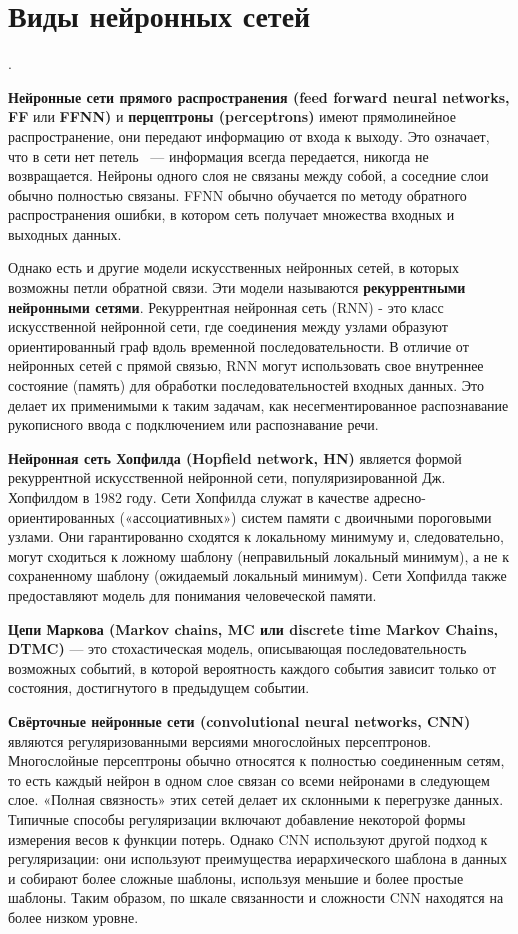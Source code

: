 \section{Виды нейронных сетей}.

 \textbf{Нейронные сети прямого распространения 
(feed forward neural networks, FF} или \textbf{FFNN)} и 
\textbf{перцептроны (perceptrons)} имеют прямолинейное распространение, они передают информацию от входа к выходу. Это означает, что в сети нет петель ~--- информация всегда передается, никогда не возвращается. Нейроны одного слоя не связаны между собой, а соседние слои обычно полностью связаны. FFNN обычно обучается по методу обратного распространения ошибки, в котором сеть получает множества входных и выходных данных.

Однако есть и другие модели искусственных нейронных сетей, в которых возможны петли обратной связи. Эти модели называются \textbf{рекуррентными нейронными сетями}. Рекуррентная нейронная сеть (RNN) - это класс искусственной нейронной сети, где соединения между узлами образуют ориентированный граф вдоль временной последовательности. В отличие от нейронных сетей с прямой связью, RNN могут использовать свое внутреннее состояние (память) для обработки последовательностей входных данных. Это делает их применимыми к таким задачам, как несегментированное распознавание рукописного ввода с подключением или распознавание речи.

\textbf{Нейронная сеть Хопфилда (Hopfield network, HN)} является формой рекуррентной искусственной нейронной сети, популяризированной Дж. Хопфилдом в 1982 году. Сети Хопфилда служат в качестве адресно-ориентированных («ассоциативных») систем памяти с двоичными пороговыми узлами. Они гарантированно сходятся к локальному минимуму и, следовательно, могут сходиться к ложному шаблону (неправильный локальный минимум), а не к сохраненному шаблону (ожидаемый локальный минимум). Сети Хопфилда также предоставляют модель для понимания человеческой памяти.

\textbf{Цепи Маркова (Markov chains, MC или discrete time Markov Chains, DTMC)} — это стохастическая модель, описывающая последовательность возможных событий, в которой вероятность каждого события зависит только от состояния, достигнутого в предыдущем событии.

\textbf{Свёрточные нейронные сети (convolutional neural networks, CNN)} являются регуляризованными версиями многослойных персептронов. Многослойные персептроны обычно относятся к полностью соединенным сетям, то есть каждый нейрон в одном слое связан со всеми нейронами в следующем слое. «Полная связность» этих сетей делает их склонными к перегрузке данных. Типичные способы регуляризации включают добавление некоторой формы измерения весов к функции потерь. Однако CNN используют другой подход к регуляризации: они используют преимущества иерархического шаблона в данных и собирают более сложные шаблоны, используя меньшие и более простые шаблоны. Таким образом, по шкале связанности и сложности CNN находятся на более низком уровне.
